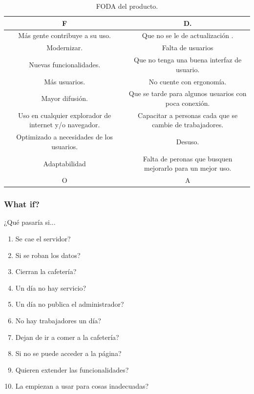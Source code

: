 \documentclass{article}
\begin{document}
\begin{center}
\begin{table}[H]
\begin{tabular}{| c | c | }
      \cellcolor{green!25}F & \cellcolor{yellow!25}D. \\ \hline
      \cellcolor{blue!25}Más gente contribuye a su uso. & \cellcolor{red!25}Que no se le de actualización . \\
      \cellcolor{blue!25}Modernizar. & \cellcolor{red!25}Falta de usuarios \\
      \cellcolor{blue!25}Nuevas funcionalidades. & \cellcolor{red!25}Que no tenga una buena interfaz de usuario. \\
      \cellcolor{blue!25}Más usuarios. & \cellcolor{red!25}No cuente con ergonomía. \\
      \cellcolor{blue!25}Mayor difusión. & \cellcolor{red!25}Que se tarde para algunos usuarios con poca conexión. \\
      \cellcolor{blue!25}Uso en cualquier explorador de internet y/o navegador. & \cellcolor{red!25}Capacitar a personas cada que se cambie de trabajadores. \\
      \cellcolor{blue!25}Optimizado a necesidades de los usuarios. & \cellcolor{red!25}Desuso.\\
      \cellcolor{blue!25}Adaptabilidad & \cellcolor{red!25}Falta de peronas que busquen mejorarlo para un mejor uso.\\
      \cellcolor{blue!25}O & \cellcolor{red!25}A\\ \hline
    \end{tabular}
    \caption{FODA del producto.}
    \label{tabla:horarios}
  \end{table}
\end{center}
\subsubsection*{What if?}
¿Qué pasaría si...
\begin{enumerate}
\item Se cae el servidor?
\item Si se roban los datos?
\item Cierran la cafetería?
\item Un día no hay servicio?
\item Un día no publica el administrador?
\item No hay trabajadores un día?
\item Dejan de ir a comer a la cafetería?
\item Si no se puede acceder a la página?
\item Quieren extender las funcionalidades?
\item La empiezan a usar para cosas inadecuadas?
\end{enumerate}
\end{document}
